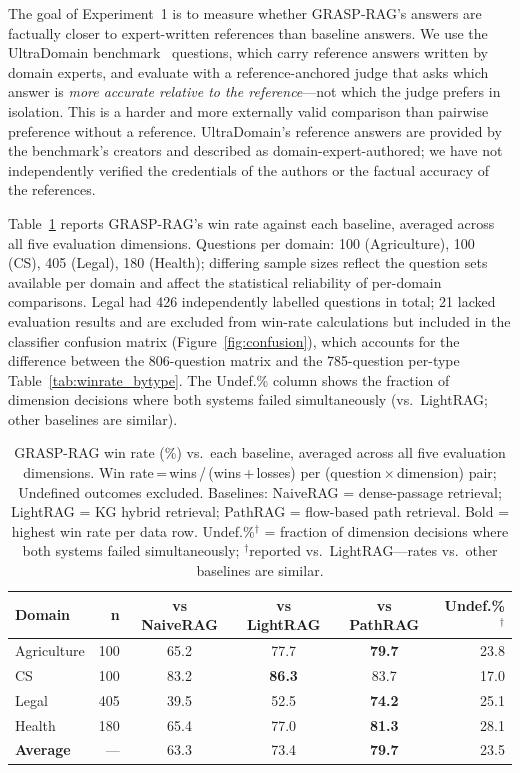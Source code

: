 The goal of Experiment~1 is to measure whether GRASP-RAG's answers are
factually closer to expert-written references than baseline answers.
We use the UltraDomain benchmark~\cite{ding2024ultradomain} questions, which
carry reference answers written by domain experts, and evaluate with a
reference-anchored judge that asks which answer is \emph{more accurate relative
to the reference}---not which the judge prefers in isolation.
This is a harder and more externally valid comparison than pairwise preference
without a reference.
UltraDomain's reference answers are provided by the benchmark's creators and
described as domain-expert-authored; we have not independently verified the
credentials of the authors or the factual accuracy of the references.

Table~\ref{tab:winrate} reports GRASP-RAG's win rate against each baseline,
averaged across all five evaluation dimensions.
Questions per domain: 100 (Agriculture), 100 (CS), 405 (Legal), 180 (Health);
differing sample sizes reflect the question sets available per domain and
affect the statistical reliability of per-domain comparisons.
Legal had 426 independently labelled questions in total; 21 lacked evaluation results
and are excluded from win-rate calculations but included in the classifier
confusion matrix (Figure~\ref{fig:confusion}), which accounts for the
difference between the 806-question matrix and the 785-question per-type
Table~\ref{tab:winrate_bytype}.
The Undef.\% column shows the fraction of dimension decisions where both
systems failed simultaneously (vs.\ LightRAG; other baselines are similar).

\begin{table}[t]
\caption{GRASP-RAG win rate (\%) vs.\ each baseline, averaged across all five
  evaluation dimensions. Win rate\,=\,wins\,/\,(wins\,+\,losses) per
  (question\,$\times$\,dimension) pair; Undefined outcomes excluded.
  Baselines: NaiveRAG = dense-passage retrieval; LightRAG = KG hybrid
  retrieval; PathRAG = flow-based path retrieval.
  Bold = highest win rate per data row.
  Undef.\%$^{\dag}$ = fraction of dimension decisions where both systems
  failed simultaneously; $^{\dag}$reported vs.\ LightRAG---rates vs.\
  other baselines are similar.}
\label{tab:winrate}
\centering
\renewcommand{\arraystretch}{1.15}
\setlength{\tabcolsep}{2.8pt}
\begin{tabular}{lrcccr}
\toprule
\textbf{Domain} & \textbf{n} & \textbf{vs NaiveRAG} & \textbf{vs LightRAG} &
  \textbf{vs PathRAG} & \textbf{Undef.\%}$^{\dag}$ \\
\midrule
Agriculture & 100 &          65.2 &          77.7 & \textbf{79.7} & 23.8 \\
CS          & 100 &          83.2 & \textbf{86.3} &          83.7 & 17.0 \\
Legal       & 405 &          39.5 &          52.5 & \textbf{74.2} & 25.1 \\
Health      & 180 &          65.4 &          77.0 & \textbf{81.3} & 28.1 \\
\midrule
\textbf{Average} & --- & 63.3 & 73.4 & \textbf{79.7} & 23.5 \\
\bottomrule
\end{tabular}
\end{table}

